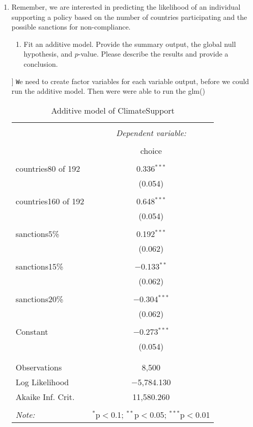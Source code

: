 \documentclass[12pt,letterpaper]{article}
\begin{document}
\begin{enumerate}
	\item
	Remember, we are interested in predicting the likelihood of an individual supporting a policy based on the number of countries participating and the possible sanctions for non-compliance.
	\begin{enumerate}
		\item [] Fit an additive model. Provide the summary output, the global null hypothesis, and $p$-value. Please describe the results and provide a conclusion.
	\end{enumerate}
		]
			\texttt We need to create factor variables for each variable output, before we could run the additive model. Then were were able to run the glm()
	\begin{table}[!htbp] \centering   \caption{Additive model of ClimateSupport}   \label{} \begin{tabular}{@{\extracolsep{5pt}}lc} \\[-1.8ex]\hline \hline \\[-1.8ex]  & \multicolumn{1}{c}{\textit{Dependent variable:}} \\ \cline{2-2} \\[-1.8ex] & choice \\ \hline \\[-1.8ex]  countries80 of 192 & 0.336$^{***}$ \\   & (0.054) \\   & \\  countries160 of 192 & 0.648$^{***}$ \\   & (0.054) \\   & \\  sanctions5\% & 0.192$^{***}$ \\   & (0.062) \\   & \\  sanctions15\% & $-$0.133$^{**}$ \\   & (0.062) \\   & \\  sanctions20\% & $-$0.304$^{***}$ \\   & (0.062) \\   & \\  Constant & $-$0.273$^{***}$ \\   & (0.054) \\   & \\ \hline \\[-1.8ex] Observations & 8,500 \\ Log Likelihood & $-$5,784.130 \\ Akaike Inf. Crit. & 11,580.260 \\ \hline \hline \\[-1.8ex] \textit{Note:}  & \multicolumn{1}{r}{$^{*}$p$<$0.1; $^{**}$p$<$0.05; $^{***}$p$<$0.01} \\ \end{tabular} \end{table} 
			\vspace{25cm}
			

\end{enumerate}
\end{document}
